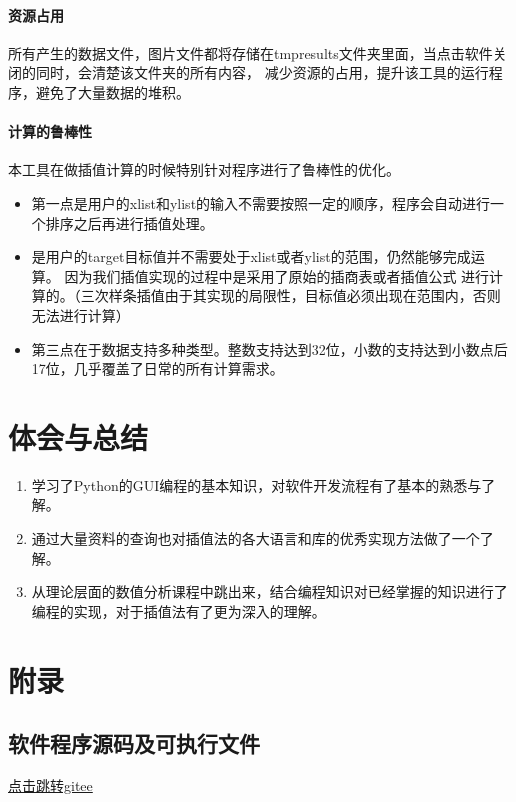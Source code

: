 \documentclass[UTF8]{ctexart}
\begin{document}
        \paragraph{资源占用} 所有产生的数据文件，图片文件都将存储在tmpresults文件夹里面，当点击软件关闭的同时，会清楚该文件夹的所有内容，
        减少资源的占用，提升该工具的运行程序，避免了大量数据的堆积。
        \paragraph{计算的鲁棒性} 本工具在做插值计算的时候特别针对程序进行了鲁棒性的优化。
            \begin{itemize}
                \item 第一点是用户的xlist和ylist的输入不需要按照一定的顺序，程序会自动进行一个排序之后再进行插值处理。
                \item 是用户的target目标值并不需要处于xlist或者ylist的范围，仍然能够完成运算。
                        因为我们插值实现的过程中是采用了原始的插商表或者插值公式
                        进行计算的。（三次样条插值由于其实现的局限性，目标值必须出现在范围内，否则无法进行计算）
                \item 第三点在于数据支持多种类型。整数支持达到32位，小数的支持达到小数点后17位，几乎覆盖了日常的所有计算需求。
            \end{itemize}
    \section{体会与总结}
        \begin{enumerate}
            \item 学习了Python的GUI编程的基本知识，对软件开发流程有了基本的熟悉与了解。
            \item 通过大量资料的查询也对插值法的各大语言和库的优秀实现方法做了一个了解。
            \item 从理论层面的数值分析课程中跳出来，结合编程知识对已经掌握的知识进行了编程的实现，对于插值法有了更为深入的理解。
            
        \end{enumerate}
    \section{附录}
        \subsection{软件程序源码及可执行文件}
        \href{https://gitee.com/hxh_create/numerical-analysis-operation}{点击跳转gitee}
        
\end{document}
